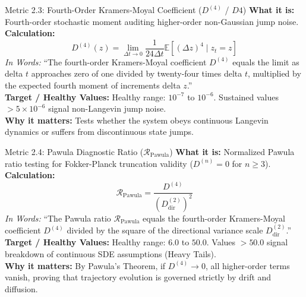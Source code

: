\documentclass[11pt,a4paper]{article}
\begin{document}
\begin{metricbox}{Metric 2.3: Fourth-Order Kramers-Moyal Coefficient ($D^{(4)}$ / $D4$)}
\textbf{What it is:} Fourth-order stochastic moment auditing higher-order non-Gaussian jump noise.\\
\textbf{Calculation:}
 $$D^{(4)}(z) = \lim_{\Delta t \to 0} \frac{1}{24 \Delta t} \mathbb{E}\left[(\Delta z)^4 \mid z_t = z\right]$$ \emph{In Words:} ``The fourth-order Kramers-Moyal coefficient $D^{(4)}$ equals the limit as delta $t$ approaches zero of one divided by twenty-four times delta $t$, multiplied by the expected fourth moment of increments delta $z$.''\\
\textbf{Target / Healthy Values:} Healthy range: $10^{-7}$ to $10^{-6}$. Sustained values $> 5 \times 10^{-6}$ signal non-Langevin jump noise.\\
\textbf{Why it matters:} Tests whether the system obeys continuous Langevin dynamics or suffers from discontinuous state jumps.
\end{metricbox}

\begin{metricbox}{Metric 2.4: Pawula Diagnostic Ratio ($\mathcal{R}_{\text{Pawula}}$)}
\textbf{What it is:} Normalized Pawula ratio testing for Fokker-Planck truncation validity ($D^{(n)} = 0$ for $n \ge 3$).\\
\textbf{Calculation:}
 $$\mathcal{R}_{\text{Pawula}} = \frac{D^{(4)}}{(D^{(2)}_{\text{dir}})^2}$$ \emph{In Words:} ``The Pawula ratio $\mathcal{R}_{\text{Pawula}}$ equals the fourth-order Kramers-Moyal coefficient $D^{(4)}$ divided by the square of the directional variance scale $D^{(2)}_{\text{dir}}$.''\\
\textbf{Target / Healthy Values:} Healthy range: $6.0$ to $50.0$. Values $> 50.0$ signal breakdown of continuous SDE assumptions (Heavy Tails).\\
\textbf{Why it matters:} By Pawula's Theorem, if $D^{(4)} \to 0$, all higher-order terms vanish, proving that trajectory evolution is governed strictly by drift and diffusion.
\end{metricbox}
\end{document}
